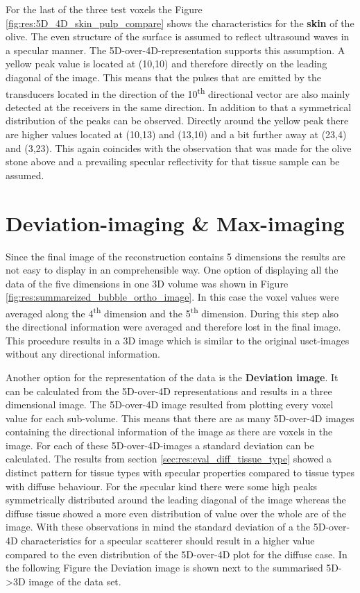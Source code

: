 \medskip

For the last of the three test voxels the Figure \ref{fig:res:5D_4D_skin_pulp_compare} shows the characteristics for the \textbf{skin} of the olive. The even structure of the surface is assumed to reflect ultrasound waves in a specular manner. The 5D-over-4D-representation supports this assumption. A yellow peak value is located at (10,10) and therefore directly on the leading diagonal of the image. This means that the pulses that are emitted by the transducers located in the direction of the 10\textsuperscript{th} directional vector are also mainly detected at the receivers in the same direction. In addition to that a symmetrical distribution of the peaks can be observed. Directly around the yellow peak there are higher values located at (10,13) and (13,10) and a bit further away at (23,4) and (3,23). This again coincides with the observation that was made for the olive stone above and a prevailing specular reflectivity for that tissue sample can be assumed.




\section{Deviation-imaging \& Max-imaging}
\label{chap:devi_image}

Since the final image of the reconstruction contains 5 dimensions the results are not easy to display in an comprehensible way. One option of displaying all the data of the five dimensions in one 3D volume was shown in Figure \ref{fig:res:summareized_bubble_ortho_image}. In this case the voxel values were averaged along the 4\textsuperscript{th} dimension and the 5\textsuperscript{th} dimension. During this step also the directional information were averaged and therefore lost in the final image. This procedure results in a 3D image which is similar to the original \ac{usct}-images without any directional information.   

\bigskip

Another option for the representation of the data is the \textbf{Deviation image}. It can be calculated from the 5D-over-4D representations and results in a three dimensional image. The 5D-over-4D image resulted from plotting every voxel value for each sub-volume. This means that there are as many 5D-over-4D images containing the directional information of the image as there are voxels in the image. For each of these 5D-over-4D-images a standard deviation can be calculated. The results from section \ref{sec:res:eval_diff_tissue_type} showed a distinct pattern for tissue types with specular properties compared to tissue types with diffuse behaviour. For the specular kind there were some high peaks symmetrically distributed around the leading diagonal of the image whereas the diffuse tissue showed a more even distribution of value over the whole are of the image. With these observations in mind the standard deviation of a the 5D-over-4D characteristics for a specular scatterer should result in a higher value compared to the even distribution of the 5D-over-4D plot for the diffuse case. In the following Figure the Deviation image is shown next to the summarised 5D->3D image of the data set.


